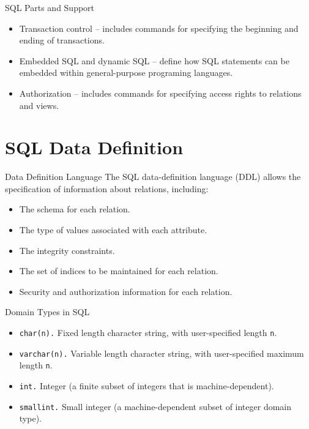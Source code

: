 \documentclass[aspectratio=169]{beamer}
\begin{document}
\begin{frame}{SQL Parts and Support}
    \begin{itemize}
        \item Transaction control -- includes commands for specifying the beginning and ending of transactions.
        \item Embedded SQL and dynamic SQL -- define how SQL statements can be embedded within general-purpose programing languages.
        \item Authorization -- includes commands for specifying access rights to relations and views.
    \end{itemize}
\end{frame}

\section{SQL Data Definition}

\begin{frame}{Data Definition Language}
    The SQL data-definition language (DDL) allows the specification of information about relations, including:
    \begin{itemize}
        \item The schema for each relation.
        \item The type of values associated with each attribute.
        \item The integrity constraints.
        \item The set of indices to be maintained for each relation.
        \item Security and authorization information for each relation.
    \end{itemize}
\end{frame}

\begin{frame}{Domain Types in SQL}
    \begin{itemize}
        \item \texttt{char(n).} Fixed length character string, with user-specified length \texttt{n}.
        \item \texttt{varchar(n).} Variable length character string, with user-specified maximum length \texttt{n}.
        \item \texttt{int.} Integer (a finite subset of integers that is machine-dependent).
        \item \texttt{smallint.} Small integer (a machine-dependent subset of integer domain type).
    \end{itemize}
\end{frame}
\end{document}
